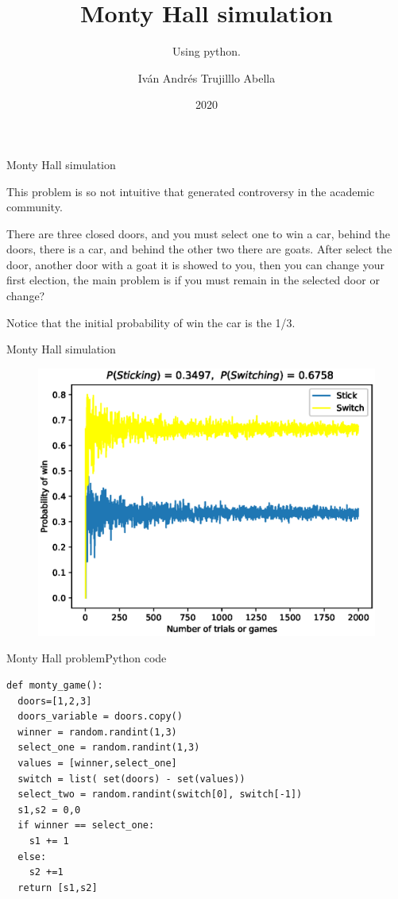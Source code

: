 \documentclass{beamer}
\institute{Javeriana}
\date{2020}
\title[Pontificia Universidad Javeriana] %
{Monty Hall simulation}
\subtitle{Using python.}
\author[Iván Andrés Trujillo Abella] 
{Iván Andrés Trujilllo Abella}
\institute[] 
{
  Facultad de Ingenieria\\
  Pontificia Universidad Javeriana
  \and
  
\textbf{ trujilloiv@javeriana.edu.co}
}
\date[MINTA] %
\begin{document}
\frame{\titlepage}



\begin{frame}{Monty Hall simulation}
\begin{block}

This problem is so not intuitive that generated controversy in the academic community. 
\end{block}

There are three closed doors,  and you must select one to win  a car,  behind the doors, there is a car, and behind the other two there are goats. After select the door, another door with a goat it is showed to you, then you can change your first election,  the main problem is if you must remain in the selected door or change?

Notice that the initial probability of win the car is the 1/3.
\end{frame}



\begin{frame}{Monty Hall simulation}{}
\begin{figure}[htbp]
\centerline{\includegraphics[scale=0.66]{./graphs/Monty.eps}}
\end{figure}
\end{frame}





\begin{frame}[fragile]{Monty Hall problem}{Python code}
\begin{lstlisting}
def monty_game():
  doors=[1,2,3]
  doors_variable = doors.copy()
  winner = random.randint(1,3)
  select_one = random.randint(1,3)
  values = [winner,select_one]
  switch = list( set(doors) - set(values))
  select_two = random.randint(switch[0], switch[-1])
  s1,s2 = 0,0
  if winner == select_one:
    s1 += 1
  else:
    s2 +=1
  return [s1,s2]
\end{lstlisting}
\end{frame}
\end{document}
